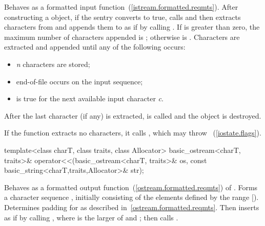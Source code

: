 \begin{itemdescr}
\pnum
\effects
Behaves as a formatted input function~(\ref{istream.formatted.reqmts}).
After constructing a
object, if the sentry converts to true, calls
and then extracts characters from  and appends them
to  as if by calling
.
If
is greater than zero, the maximum
number  of characters appended is
;
otherwise  is
.
Characters are extracted and appended until any of the following
occurs:

\begin{itemize}
\item
\textit{n}
characters are stored;
\item
end-of-file occurs on the input sequence;
\item
{}
is true for the next available input character
\textit{c}.
\end{itemize}

\pnum
After the last character (if any) is extracted,
is called and the
object  is destroyed.

\pnum
If the function extracts no characters, it calls
,
which may throw
~(\ref{iostate.flags}).

\pnum
\returns
{}
\end{itemdescr}

%
%
\begin{itemdecl}
template<class charT, class traits, class Allocator>
  basic_ostream<charT, traits>&
    operator<<(basic_ostream<charT, traits>& os,
               const basic_string<charT,traits,Allocator>& str);
\end{itemdecl}

\begin{itemdescr}
\pnum
\effects
Behaves as a formatted output
function~(\ref{ostream.formatted.reqmts}) of . Forms a character sequence
, initially consisting of the elements defined by the range
[). Determines padding for 
as described in~\ref{ostream.formatted.reqmts}.
Then inserts  as if by calling
, where  is the larger
of  and ;
then calls .

\pnum
\returns
{}
\end{itemdescr}

